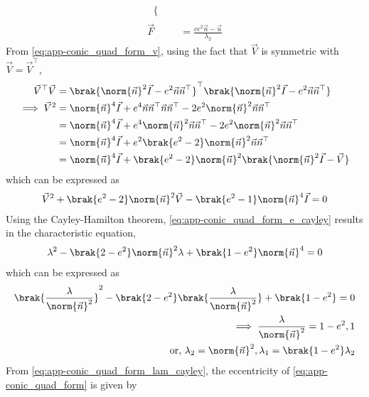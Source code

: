 \begin{enumerate}[label=\thesubsection.\arabic*.,ref=\thesubsection.\theenumi]
\begin{align}
\begin{split}
\begin{cases}
  \end{cases}
	\end{split}
  \\
  \label{eq:app-conic_quad_form_F} 
  \vec{F}  &= \frac{ce^2\vec{n}-\vec{u}}{\lambda_2}
\end{align}  
	\label{app:conic-parameters}
	\solution
	From \eqref{eq:app-conic_quad_form_v}, using the fact that $\vec{V}$ is symmetric with $\vec{V} = \vec{V}^{\top}$,
  \begin{align}
	  \vec{V}^{\top} \vec{V}&=\brak{\norm{\vec{n}}^2\vec{I}-e^2\vec{n}\vec{n}^{\top}}^{\top}
	  \brak{\norm{\vec{n}}^2\vec{I}-e^2\vec{n}\vec{n}^{\top}}
    \\
	  \implies \vec{V}^{2} &= \norm{\vec{n}}^4\vec{I}+e^4\vec{n}\vec{n}^{\top}\vec{n}\vec{n}^{\top}
	  -2e^2\norm{\vec{n}}^2\vec{n}\vec{n}^{\top}
    \\
	  &= \norm{\vec{n}}^4\vec{I} + e^4\norm{\vec{n}}^2\vec{n}\vec{n}^{\top}
	  - 2e^2\norm{\vec{n}}^2\vec{n}\vec{n}^{\top}
    \\
	  &= \norm{\vec{n}}^4\vec{I} + e^2\brak{e^2 - 2}\norm{\vec{n}}^2\vec{n}\vec{n}^{\top}
    \\
	  &= \norm{\vec{n}}^4\vec{I} + \brak{e^2 - 2}\norm{\vec{n}}^2\brak{\norm{\vec{n}}^2\vec{I}- \vec{V}}
    \end{align}
%    
which can be expressed as
\begin{align}
  \vec{V}^{2} + \brak{e^2 - 2}\norm{\vec{n}}^2\vec{V} - \brak{e^2 - 1}\norm{\vec{n}}^4\vec{I}=0
  \label{eq:app-conic_quad_form_e_cayley}
\end{align}
	Using the Cayley-Hamilton theorem,
	\eqref{eq:app-conic_quad_form_e_cayley} results in the characteristic equation, 
\begin{align}
  \lambda^{2} - \brak{2-e^2}\norm{\vec{n}}^2\lambda + \brak{1-e^2 }\norm{\vec{n}}^4=0
\end{align}
which can be expressed as
\begin{align}
\brak{\frac{\lambda}{\norm{\vec{n}}^2}}^2 - \brak{2-e^2 }\brak{\frac{\lambda}{\norm{\vec{n}}^2}} 
	+ \brak{1-e^2 } = 0
	\\
	\implies \frac{\lambda}{\norm{\vec{n}}^2} = 1-e^2, 1
  \\
	\text{or, }\lambda_2 = \norm{\vec{n}}^2, \lambda_1 = \brak{1-e^2}\lambda_2 
  \label{eq:app-conic_quad_form_lam_cayley}
\end{align}
From   \eqref{eq:app-conic_quad_form_lam_cayley}, the eccentricity of \eqref{eq:app-conic_quad_form} is given by 

\end{enumerate}
